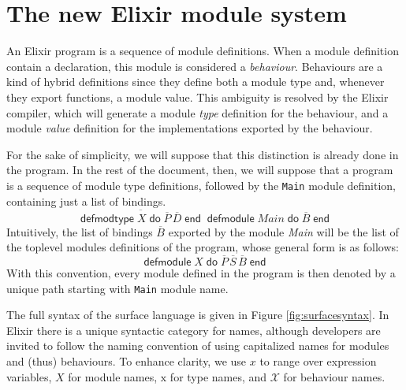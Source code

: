 \documentclass[a4paper,10pt]{article}
\DeclareMathOperator{\kwdefmt}{\textsf{defmodtype}}
\DeclareMathOperator{\kwend}{\textsf{end}}
\DeclareMathOperator{\kwdo}{\textsf{do}}
\DeclareMathOperator{\kwdefm}{\textsf{defmodule}}
\newcommand{\tx}{\textrm{x}}
\begin{document}
\section{The new Elixir module system}
An Elixir program is a sequence of module definitions. When a module definition contain a  declaration, this module is considered a \emph{behaviour}. Behaviours are a kind of hybrid definitions since they define both a module type and, whenever they export functions, a module value. This ambiguity is resolved by the Elixir compiler, which will generate a module \emph{type} definition for the behaviour, and a module \emph{value} definition for the implementations exported by the behaviour.

For the sake of simplicity, we will suppose that this distinction is already done in the program. In the rest of the document, then, we will suppose that a program is a sequence of module type definitions, followed by the \texttt{Main} module definition, containing just a list of bindings. 
\[\overline{\kwdefmt X \kwdo \overline{P}\, \overline{D} \kwend}\kwdefm \textit{Main} \kwdo \overline{B} \kwend\]
Intuitively, the list of bindings $\overline{B}$ exported by the module \textit{Main} will be the list of the toplevel modules definitions of the program, whose general form is as follows: 
\begin{equation}\label{eq:module}
\kwdefm X \kwdo \overline{P}\, \overline{S}\, \overline{B} \kwend
\end{equation}
With this convention, every module defined in the program is then denoted by a unique path starting with \texttt{Main} module name.

The full syntax of the surface language is given in Figure \ref{fig:surfacesyntax}. In Elixir there is a unique syntactic category for names, although developers are invited to follow the naming convention of using capitalized names for modules and (thus) behaviours. To enhance clarity, we use $x$ to range over expression variables, $X$ for module names, $\tx$ for type names, and $\mathcal X$ for behaviour names. 
\end{document}
